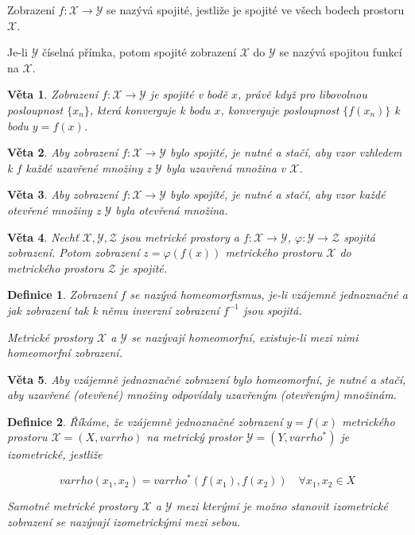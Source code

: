 \documentclass[a4paper, 11pt]{report}
\newtheorem{mydef}{Definice}[chapter]
\newtheorem{veta}{Věta}[chapter]
\begin{document}
Zobrazení $f: \mathcal{X} \to \mathcal{Y}$ se nazývá spojité, jestliže je spojité ve všech bodech prostoru $\mathcal{X}$.

Je-li $\mathcal{Y}$ číselná přímka, potom spojité zobrazení $\mathcal{X}$ do $\mathcal{Y}$ se nazývá spojitou funkcí na $\mathcal{X}$.

\begin{veta}
Zobrazení $f: \mathcal{X} \to \mathcal{Y}$ je spojité v bodě $x$, právě když pro libovolnou posloupnost $\{x_n\}$, která konverguje k bodu $x$, konverguje posloupnost $\{f(x_n)\}$ k bodu $y = f(x)$.
\end{veta}

\begin{veta}
Aby zobrazení $f: \mathcal{X} \to \mathcal{Y}$ bylo spojité, je nutné a stačí, aby vzor vzhledem k $f$ každé uzavřené množiny z $\mathcal{Y}$ byla uzavřená množina v $\mathcal{X}$.
\end{veta}

\begin{veta}
Aby zobrazení $f: \mathcal{X} \to \mathcal{Y}$ bylo spojíté, je nutné a stačí, aby vzor každé otevřené množiny z $\mathcal{Y}$ byla otevřená množina.
\end{veta}

\begin{veta}
Nechť $\mathcal{X}, \mathcal{Y}, \mathcal{Z}$ jsou metrické prostory a $f: \mathcal{X} \to \mathcal{Y}$, $\varphi: \mathcal{Y} \to \mathcal{Z}$ spojitá zobrazení. Potom zobrazení $z = \varphi(f(x))$ metrického prostoru $\mathcal{X}$ do metrického prostoru $\mathcal{Z}$ je spojité.
\end{veta}

\begin{mydef}
Zobrazení $f$ se nazývá homeomorfismus, je-li vzájemně jednoznačné a jak zobrazení tak k němu inverzní zobrazení $f^{-1}$ jsou spojitá.

Metrické prostory $\mathcal{X}$ a $\mathcal{Y}$ se nazývají homeomorfní, existuje-li mezi nimi homeomorfní zobrazení.
\end{mydef}

\begin{veta}
Aby vzájemně jednoznačné zobrazení bylo homeomorfní, je nutné a stačí, aby uzavřené (otevřené) množiny odpovídaly uzavřeným (otevřeným) množinám.
\end{veta}

\begin{mydef}
Říkáme, že vzájemně jednoznačné zobrazení $y = f(x)$ metrického prostoru $\mathcal{X} = (X, varrho)$ na metrický prostor $\mathcal{Y} = (Y, varrho^*)$ je izometrické, jestliže

$$ varrho(x_1, x_2) = varrho^*(f(x_1), f(x_2)) \quad \forall x_1, x_2 \in X $$

Samotné metrické prostory $\mathcal{X}$ a $\mathcal{Y}$ mezi kterými je možno stanovit izometrické zobrazení se nazývají izometrickými mezi sebou.
\end{mydef}
\end{document}
